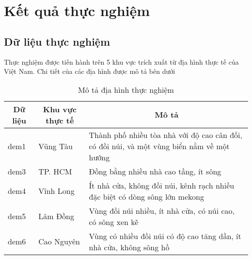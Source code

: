 \chapter{Kết quả thực nghiệm}
\section{Dữ liệu thực nghiệm}
Thực nghiệm được tiến hành trên 5 khu vực trích xuất từ địa hình thực tế của Việt Nam. Chi tiết của các địa hình được mô tả bên dưới 
\BlankLine

\begin{table}[H]
    \begin{tabularx}{\textwidth}{|l|l|X|}
        \hline
        \multicolumn{1}{|c|}{\textbf{Dữ liệu}} & \multicolumn{1}{c|}{\textbf{Khu vực thực tế}} & \multicolumn{1}{c|}{\textbf{Mô tả}}                                                                 \\ \hline
        dem1 & Vũng Tàu                             & Thành phố nhiều tòa nhà với độ cao cân đối, có đồi núi, và một vùng biển nằm về một hướng  \\ \hline
        dem3 & TP. HCM                           & Đồng bằng nhiều nhà cao tầng, ít sông                            \\ \hline
        dem4 & Vĩnh Long                            & Ít nhà cửa, không đồi núi, kênh rạch nhiều đặc biệt có dòng sông lớn mekong                \\ \hline
        dem5 & Lâm Đồng                             & Vùng đồi núi nhiều, ít nhà cửa, có núi cao, có sông xen kẽ                                \\ \hline
        dem6 & Cao Nguyên                           & Vùng có nhiều đồi núi có độ cao tăng dần, ít nhà cửa, không sông hồ                        \\ \hline
    \end{tabularx}
    \caption{Mô tả địa hình thực nghiệm}
\end{table}

